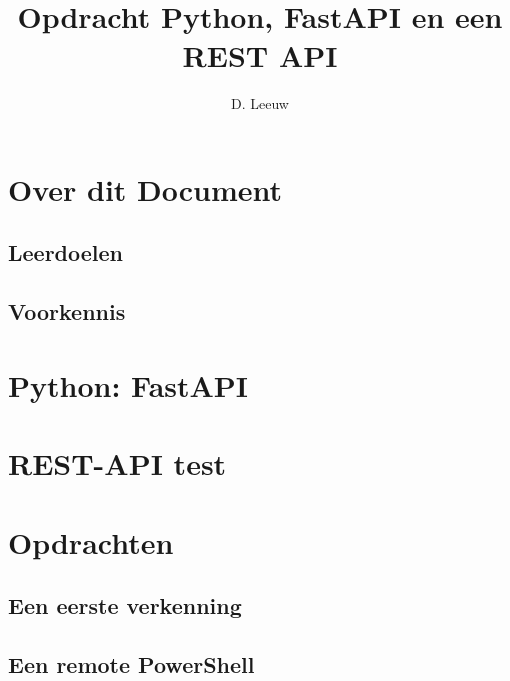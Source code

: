 \documentclass[a4paper,12pt,twoside,openright,titlepage]{article}
\author{D. Leeuw}
\title{Opdracht Python, FastAPI en een REST API}
\date{\today\\
0.6.0 \\
\vfill
\raggedright
\copyright\ 2025-2026 Dennis Leeuw\\
}
\begin{document}

\maketitle


\section{Over dit Document}
\subsection{Leerdoelen}

\subsection{Voorkennis}




\section{Python: FastAPI}


\section{REST-API test}


\section{Opdrachten}
\subsection{Een eerste verkenning}

\subsection{Een remote PowerShell}


\printindex
\end{document}
